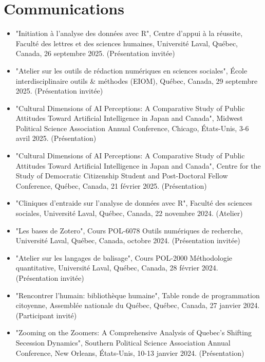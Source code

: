 \documentclass[11pt,letterpaper,sans]{moderncv}        %
\begin{document}
\section{Communications}
\begin{itemize}
   
    \item "Initiation à l'analyse des données avec R", Centre d'appui à la réussite, Faculté des lettres et des sciences humaines, Université Laval, Québec, Canada, 26 septembre 2025. (Présentation invitée)

    \item "Atelier sur les outils de rédaction numériques en sciences sociales", École interdisciplinaire outils \& méthodes (EIOM), Québec, Canada, 29 septembre 2025. (Présentation invitée)
    \item "Cultural Dimensions of AI Perceptions: A Comparative Study of Public Attitudes Toward Artificial Intelligence in Japan and Canada", Midwest Political Science Association Annual Conference, Chicago, États-Unis, 3-6 avril 2025. (Présentation)
  \item "Cultural Dimensions of AI Perceptions: A Comparative Study of Public Attitudes Toward Artificial Intelligence in Japan and Canada", Centre for the Study of Democratic Citizenship Student and Post-Doctoral Fellow Conference, Québec, Canada, 21 février 2025. (Présentation)
  \item "Cliniques d’entraide sur l’analyse de données avec R", Faculté des sciences sociales, Université Laval, Québec, Canada, 22 novembre 2024. (Atelier)
  \item "Les bases de Zotero", Cours POL-6078 Outils numériques de recherche, Université Laval, Québec, Canada, octobre 2024. (Présentation invitée)
  \item "Atelier sur les langages de balisage", Cours POL-2000 Méthodologie quantitative, Université Laval, Québec, Canada, 28 février 2024. (Présentation invitée)
  \item "Rencontrer l’humain: bibliothèque humaine", Table ronde de programmation citoyenne, Assemblée nationale du Québec, Québec, Canada, 27 janvier 2024. (Participant invité)
  \item "Zooming on the Zoomers: A Comprehensive Analysis of Quebec's Shifting Secession Dynamics", Southern Political Science Association Annual Conference, New Orleans, États-Unis, 10-13 janvier 2024. (Présentation)
\end{itemize}
\end{document}
